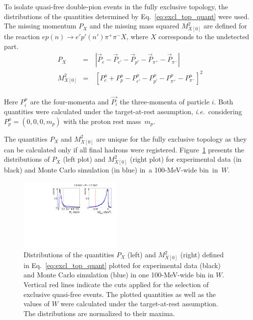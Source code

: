 \documentclass[prc,twocolumn,superscriptaddress,showpacs,amssymb,amsmath,amsfonts,aps,nofootinbib]{revtex4-1}
\begin{document}
To isolate quasi-free double-pion events in the fully exclusive topology, the distributions of the quantities determined by Eq.\!~\eqref{eq:excl_top_quant} were used. The missing momentum $P_{X}$ and the missing mass squared $M^{2}_{X[0]}$ are defined for the reaction $ep(n)\rightarrow e'p'(n')\pi^{+}\pi^{-}X$, where $X$ corresponds to the undetected part.\vspace{-1em}
\begin{equation}
\begin{aligned}
&P_{X}&=&~|\overrightarrow{P}_{e} - \overrightarrow{P}_{e'}- \overrightarrow{P}_{p'} - \overrightarrow{P}_{\pi^{+}} - \overrightarrow{P}_{\pi^{-}}|\\[-2pt]
&M_{X[0]}^{2}&=&~[P_{e}^{\mu} + P_{p}^{\mu}- P_{e'}^{\mu}- P_{p'}^{\mu}-  P_{\pi^{+}}^{\mu} - P_{\pi^{-}}^{\mu}]^{2}\\[-2pt]
\end{aligned}\label{eq:excl_top_quant}
\end{equation}%

Here $P_{i}^{\mu}$ are the four-momenta and $\overrightarrow{P_{i}}$ the three-momenta of particle $i$. Both quantities were calculated under the target-at-rest assumption, {\it i.e.}~considering $P^{\mu}_{p} = (0,0,0,m_{p})$ with the proton rest mass~$m_{p}$.


The quantities $P_{X}$ and $M^{2}_{X[0]}$ are unique for the fully exclusive topology as they can be calculated only if all final hadrons were registered. Figure~\ref{fig:excl_top_cut} presents the distributions of $P_{X}$ (left plot) and $M^{2}_{X[0]}$ (right plot) for experimental data (in black) and Monte Carlo simulation (in blue) in~a 100-MeV-wide bin~in~$W$. 



\begin{figure}[htp]
\begin{center}
\includegraphics[width=0.45\textwidth,keepaspectratio]{pictures/event_selection/excl_cut_fully_extop2.pdf}
\vspace{-0.1cm}
\caption{Distributions of the quantities $P_{X}$ (left) and $M^{2}_{X[0]}$ (right) defined in Eq.\!~\eqref{eq:excl_top_quant} plotted for experimental data (black) and Monte Carlo simulation (blue) in one 100-MeV-wide bin in $W$. Vertical red lines indicate the cuts applied for the selection of exclusive quasi-free events. The plotted quantities as well as the values of $W$ were calculated under the target-at-rest assumption. The distributions are normalized to their maxima.}
\label{fig:excl_top_cut}
\end{center}
\end{figure}
\end{document}
